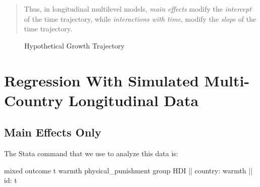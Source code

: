 \documentclass[
  letterpaper,
  DIV=11,
  numbers=noendperiod]{scrreprt}
\newenvironment{Shaded}{\begin{snugshade}}{\end{snugshade}}
\newcommand{\FunctionTok}[1]{\textcolor[rgb]{0.28,0.35,0.67}{#1}}
\newcommand{\NormalTok}[1]{\textcolor[rgb]{0.00,0.23,0.31}{#1}}
\begin{document}
\begin{quote}
Thus, in longitudinal multilevel models, \emph{main effects} modify the
\emph{intercept} of the time trajectory, while \emph{interactions with
time}, modify the \emph{slope} of the time trajectory.
\end{quote}

\begin{figure}


\caption{\label{fig-trajectory}Hypothetical Growth Trajectory}

\end{figure}%

\section{Regression With Simulated Multi-Country Longitudinal
Data}\label{sec-regressionlongitudinal}

\subsection{Main Effects Only}\label{main-effects-only}

The Stata command that we use to analyze this data is:

\begin{Shaded}
\begin{Highlighting}[]

\NormalTok{mixed outcome t warmth physical\_punishment }\FunctionTok{group}\NormalTok{ HDI || country: warmth || id: t}
\end{Highlighting}
\end{Shaded}
\end{document}
